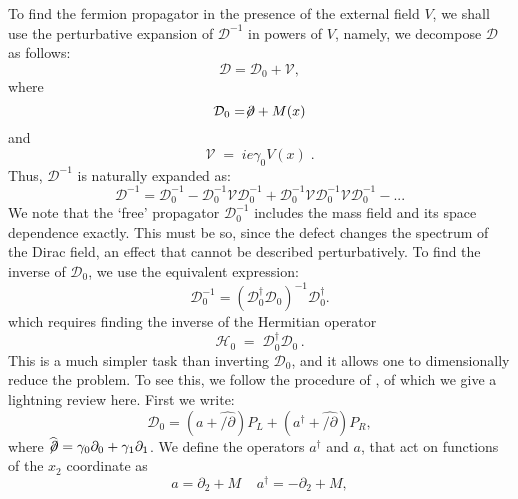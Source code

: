 \documentclass[a4paper,12pt]{article}
\begin{document}
{{To find the fermion propagator in the presence of the external field
$V$, we shall use the perturbative expansion of ${\mathcal D}^{-1}$ in
powers of $V$, namely, we decompose ${\mathcal D}$ as follows:
\begin{equation}
{\mathcal D} = {\mathcal D}_0 + {\mathcal V},
\end{equation}
where
\begin{equation}
{\mathcal D}_0 = \not\!\partial + M(x)
\end{equation}
and
\begin{equation}
{\mathcal V} \;=\; i e \gamma_0  V(x)\;.
\end{equation}
Thus, ${\mathcal D}^{-1}$ is naturally expanded as:
\begin{equation}
{\mathcal D}^{-1} = {\mathcal D}_0 ^{-1} - {\mathcal D}_0 ^{-1}
{\mathcal V} {\mathcal D}_0 ^{-1} + {\mathcal D}_0 ^{-1} {\mathcal V}
{\mathcal D}_0 ^{-1} {\mathcal V} {\mathcal D}_0 ^{-1}
-...\label{perturbaciones}
\end{equation}
We note that the `free' propagator ${\mathcal D}_0^{-1}$ includes the
mass field and its space dependence exactly. This must be so, since
the defect changes the spectrum of the Dirac field, an effect that
cannot be described perturbatively. To find the inverse of ${\mathcal
  D}_0$, we use the equivalent expression:
\begin{equation}
{\mathcal D}_0 ^{-1}=({\mathcal D}_0 ^{\dagger}{\mathcal D}_0)
^{-1}{\mathcal D}_0 ^{\dagger} \label{SdeH}.
\end{equation}
which requires finding the inverse of the Hermitian operator
\begin{equation}
   \label{eq:defh0}
{\mathcal H}_0 \;=\; {\mathcal D}_0^\dagger {\mathcal D}_0 \,.
\end{equation}
This is a much simpler task than inverting ${\mathcal D}_0$, and it
allows one to dimensionally reduce the problem. To see this, we follow
the procedure of \cite{p1}, of which we give a lightning review here.
First we write:
\begin{equation}
{\mathcal D}_0 = (a + \widehat{/\!\!\!\partial} ) P_L + (a^{\dagger} + \widehat{/\!\!\!\partial}
 ) P_R \label{Ddea} ,
\end{equation}
where $\widehat{\not\!\partial} = \gamma_0 \partial_0 + \gamma_1
\partial_1$.  We define the operators $a^{\dagger}$ and $a$, that act
on functions of the $x_2$ coordinate as
\begin{equation}
   \label{op2}
a = \partial_2 + M \;\;\;\; a^{\dagger} = -\partial_2 + M,

\end{equation}}}
\end{document}
